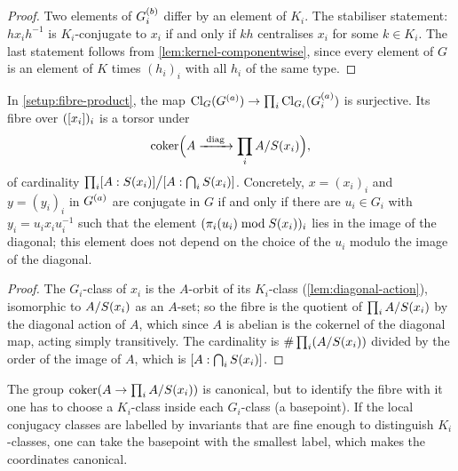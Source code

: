 \begin{proof}
Two elements of $G_i^{(b)}$ differ by an element of $K_i$. The
stabiliser statement: $hx_ih^{-1}$ is $K_i$-conjugate to $x_i$ if and only
if $kh$ centralises $x_i$ for some $k \in K_i$. The last statement follows
from \cref{lem:kernel-componentwise}, since every element of $G$ is an
element of $K$ times $(h_i)_i$ with all $h_i$ of the same type.
\end{proof}

\begin{proposition}\label{prop:fibres-over-local}
In \cref{setup:fibre-product}, the map
$\mathrm{Cl}_{G}(G^{(a)}) \to \prod_i \mathrm{Cl}_{G_i}(G_i^{(a)})$
is surjective. Its fibre over $([x_i])_i$ is a torsor under
\[
  \Coker\Bigl(A \xrightarrow{\ \mathrm{diag}\ } \prod_i A/\CentralizerImage{x_i}\Bigr),
\]
of cardinality $\prod_i[A:S(x_i)]\big/
[A:\bigcap_iS(x_i)]$. Concretely, $x = (x_i)_i$ and
$y = (y_i)_i$ in $G^{(a)}$ are conjugate in $G$ if and only if there
are $u_i \in G_i$ with $y_i = u_ix_iu_i^{-1}$ such that the element
$(\pi_i(u_i) \bmod S(x_i))_i$ lies in the image of the
diagonal; this element does not depend on the choice of the $u_i$ modulo
the image of the diagonal.
\end{proposition}

\begin{proof}
The $G_i$-class of $x_i$ is the $A$-orbit of its $K_i$-class
(\cref{lem:diagonal-action}), isomorphic to $A/S(x_i)$ as
an $A$-set; so the fibre is the quotient of $\prod_i A/S(x_i)$
by the diagonal action of $A$, which since $A$ is abelian is the cokernel
of the diagonal map, acting simply transitively. The cardinality is
$\#\prod_i(A/S(x_i))$ divided by the order of the image of
$A$, which is $[A:\bigcap_iS(x_i)]$.
\end{proof}

\begin{remark}\label{rem:basepoints}
The group $\operatorname{coker}(A \to \prod_i A/S(x_i))$ is canonical,
but to identify the fibre with it one has to choose a $K_i$-class inside
each $G_i$-class (a basepoint). If the local conjugacy classes are labelled
by invariants that are fine enough to distinguish $K_i$-classes, one can
take the basepoint with the smallest label, which makes the coordinates
canonical.
\end{remark}

